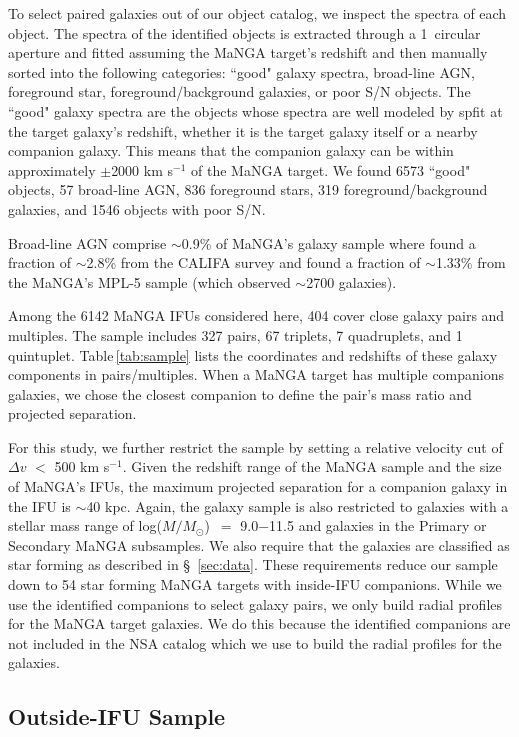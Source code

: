 \documentclass[apj,twocolumn]{emulateapj}
\newcommand{\logm}{log($M/M_{\odot}$)}
\begin{document}
\begin{CJK*}{UTF8}{gbsn}
To select paired galaxies out of our object catalog, we inspect the spectra of each object. The spectra of the identified objects is extracted through a 1\arcsec\ circular aperture and fitted assuming the MaNGA target's redshift and then manually sorted into the following categories: ``good" galaxy spectra, broad-line AGN, foreground star, foreground/background galaxies, or poor S/N objects. The ``good" galaxy spectra are the objects whose spectra are well modeled by {\sc spfit} at the target galaxy's redshift, whether it is the target galaxy itself or a nearby companion galaxy. This means that the companion galaxy can be within approximately $\pm$2000 km s$^{-1}$ of the MaNGA target. We found 6573 ``good" objects, 57 broad-line AGN, 836 foreground stars, 319 foreground/background galaxies, and 1546 objects with poor S/N. 

Broad-line AGN comprise $\sim$0.9\% of MaNGA's galaxy sample where \citet{Lacerda:2020} found a fraction of $\sim$2.8\% from the CALIFA survey and \citet{Sanchez:2018} found a fraction of $\sim$1.33\% from the MaNGA's MPL-5 sample (which observed $\sim$2700 galaxies).  

Among the 6142 MaNGA IFUs considered here, 404 cover close galaxy pairs and multiples. The sample includes 327 pairs, 67 triplets, 7 quadruplets, and 1 quintuplet. Table\,\ref{tab:sample} lists the coordinates and redshifts of these galaxy components in pairs/multiples. When a MaNGA target has multiple companions galaxies, we chose the closest companion to define the pair's mass ratio and projected separation.

For this study, we further restrict the sample by setting a relative velocity cut of $\Delta v$ $<$ 500 km s$^{-1}$. Given the redshift range of the MaNGA sample and the size of MaNGA's IFUs, the maximum projected separation for a companion galaxy in the IFU is $\sim$40 kpc. Again, the galaxy sample is also restricted to galaxies with a stellar mass range of \logm\ $=$ 9.0$-$11.5 and galaxies in the Primary or Secondary MaNGA subsamples. We also require that the galaxies are classified as star forming as described in \S~\ref{sec:data}. These requirements reduce our sample down to 54 star forming MaNGA targets with inside-IFU companions. While we use the identified companions to select galaxy pairs, we only build radial profiles for the MaNGA target galaxies. We do this because the identified companions are not included in the NSA catalog which we use to build the radial profiles for the galaxies.

\subsection{Outside-IFU Sample}\label{sec:outside}


\end{CJK*}
\end{document}
